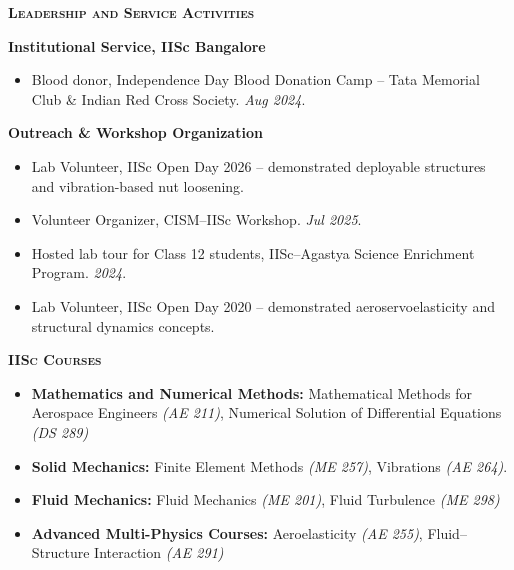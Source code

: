\documentclass[11pt]{article}
\renewcommand{\section}[1]{%
  \par\vspace{12pt}%
  {\centerline{\large\bfseries\scshape #1}}\par\vspace{-6pt}%
  \noindent{\color{black!20}\rule{\linewidth}{1pt}}\par\vspace{5pt}%
}
\newenvironment{list2}{\begin{itemize}[leftmargin=0.2in,itemsep=0pt,topsep=2pt,parsep=0pt]}{\end{itemize}}
\begin{document}
\section{Leadership and Service Activities}

\textbf{Institutional Service, IISc Bangalore}
\begin{list2}
\item Blood donor, Independence Day Blood Donation Camp -- Tata Memorial Club \& Indian Red Cross Society. \textit{Aug 2024}.
\end{list2}

\vspace{4pt}
\textbf{Outreach \& Workshop Organization}
\begin{list2}
\item Lab Volunteer, IISc Open Day 2026 -- demonstrated deployable structures and vibration-based nut loosening.
\vspace{4pt}
\item Volunteer Organizer, CISM--IISc Workshop. \textit{Jul 2025}.
\vspace{4pt}
\item Hosted lab tour for Class 12 students, IISc--Agastya Science Enrichment Program. \textit{2024}.
\vspace{4pt}
\item Lab Volunteer, IISc Open Day 2020 -- demonstrated aeroservoelasticity and structural dynamics concepts.
\end{list2}

\section{IISc Courses}
\begin{list2}
\item \textbf{Mathematics and Numerical Methods:} Mathematical Methods for Aerospace Engineers \textit{(AE 211)}, Numerical Solution of Differential Equations \textit{(DS 289)}
\item \textbf{Solid Mechanics:} Finite Element Methods \textit{(ME 257)}, Vibrations \textit{(AE 264)}.
\item \textbf{Fluid Mechanics:} Fluid Mechanics \textit{(ME 201)}, Fluid Turbulence \textit{(ME 298)}
\item \textbf{Advanced Multi-Physics Courses:} Aeroelasticity \textit{(AE 255)}, Fluid--Structure Interaction \textit{(AE 291)}
\end{list2}
\end{document}
